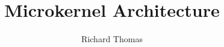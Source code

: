 \documentclass{csse4400}
\title{Microkernel Architecture}
\author{Richard Thomas}
\date{\week{3}}
\begin{document}
\makecover





\end{document}

